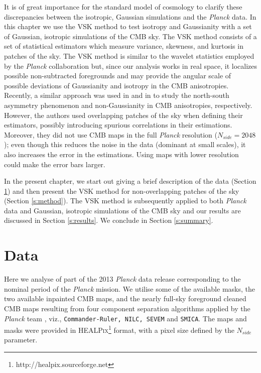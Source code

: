 It is of great importance for the standard model of cosmology to clarify these discrepancies between the isotropic, Gaussian simulations and the \textit{Planck} data. In this chapter we use the VSK method to test isotropy and Gaussianity with a set of Gaussian, isotropic simulations of the CMB sky. The VSK method consists of a set of statistical estimators which measure variance, skewness, and kurtosis in patches of the sky. The VSK method is similar to the wavelet statistics employed by the \textit{Planck} collaboration but, since our analysis works in real space, it localizes possible non-subtracted foregrounds and may provide the angular scale of possible deviations of Gaussianity and isotropy in the CMB anisotropies. Recently, a similar approach was used in \cite{Bernui:2014oda} and in \cite{Bernui:2014gla} to study the north-south asymmetry phenomenon and non-Gaussianity in CMB anisotropies, respectively. However, the authors used overlapping patches of the sky when defining their estimators, possibly introducing spurious correlations in their estimations. Moreover, they did not use CMB maps in the full \textit{Planck} resolution ($N_{side}=2048$); even though this reduces the noise in the data (dominant at small scales), it also increases the error in the estimations. Using maps with lower resolution could make the error bars larger.

In the present chapter, we start out giving a brief description of the data (Section \ref{s:data}) and then present the VSK method for non-overlapping patches of the sky (Section \ref{s:method}). The VSK method is subsequently applied to both \textit{Planck} data and Gaussian, isotropic simulations of the CMB sky and our results are discussed in Section \ref{s:results}. We conclude in Section \ref{s:summary}.

\section{Data}
\label{s:data}

Here we analyse of part of the 2013 \textit{Planck} data release corresponding to the nominal period of the \textit{Planck} mission. We utilise some of the available masks, the two available inpainted CMB maps, and the nearly full-sky foreground cleaned CMB maps resulting from four  component separation algorithms applied by the \textit{Planck} team \cite{Ade:2013crn}, viz., \texttt{Commander-Ruler, NILC, SEVEM} and \texttt{SMICA}. The maps and masks were provided in \textsc{HEALPix}\footnote{http://healpix.sourceforge.net} format, with a pixel size defined by the $N_{side}$ parameter. 

